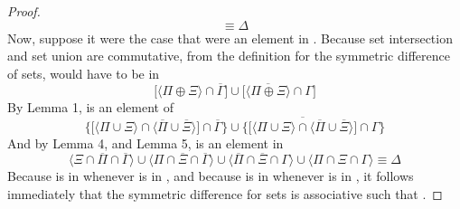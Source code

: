 \documentclass[preview]{standalone}
\begin{document}
\begin{proof}
\begin{equation*}
            \equiv
        \Delta
    \end{equation*}
    Now, suppose it were the case that \bm{$\zeta$} were an element in
    \bm{$
        \Gamma 
            \oplus 
    \big \langle \Pi \oplus \Xi \big \rangle
    $}. Because set intersection and set union are commutative,
    from the definition for the symmetric difference of sets,
    \bm{$\zeta$} would have to be in
    \begin{equation*}
        \bigg[
            \Big \langle \Pi \oplus \Xi \Big \rangle
                \cap
            \overline{\Gamma}
        \bigg]
            \cup
        \bigg[
            \Big \langle \overline{
                \Pi \oplus \Xi
            } \Big \rangle
                \cap
            \Gamma 
        \bigg]
    \end{equation*}
    By Lemma 1, \bm{$\zeta$} is an element of
    \begin{equation*}
        \Bigg\{
            \bigg[
                \Big \langle \Pi \cup \Xi \Big \rangle
                    \cap
                \Big \langle \overline{\Pi} \cup \overline{\Xi} \Big \rangle
            \bigg]
                \cap
            \overline{\Gamma}
        \Bigg\}
            \cup
        \Bigg\{
            \bigg[ \overline{
                \Big \langle \Pi \cup \Xi \Big \rangle
                \cap
            \Big \langle \overline{\Pi} \cup \overline{\Xi} \Big \rangle
            } \bigg]
                \cap
            \Gamma
        \Bigg\}
    \end{equation*}
    And by Lemma 4, and Lemma 5, \bm{$\zeta$} is an element in
    \begin{equation*}
        \Big \langle \Xi \cap \overline{\Pi} \cap \overline{\Gamma} \Big \rangle
            \cup
        \Big \langle \Pi \cap \overline{\Xi} \cap \overline{\Gamma} \Big \rangle
            \cup
        \Big \langle \overline{\Pi} \cap \overline{\Xi} \cap \Gamma \Big \rangle
            \cup
        \Big \langle \Pi \cap \Xi \cap \Gamma \Big \rangle
            \equiv
        \Delta
    \end{equation*}
    Because \bm{$\zeta$} is in \bm{$\Delta$} whenever \bm{$\zeta$} is in
    \bm{$\big \langle \Gamma \oplus \Pi \big \rangle \oplus \Xi$}, 
    and because \bm{$\zeta$} is in \bm{$\Delta$} whenever \bm{$\zeta$} is in
    \bm{$\Gamma \oplus \big \langle \Pi \oplus \Xi \big \rangle$}, 
    it follows immediately that the symmetric difference for sets is associative such that 
    \bm{$
        \big \langle \Gamma \oplus \Pi \big \rangle
            \oplus 
        \Xi 
            = 
        \Gamma 
            \oplus 
        \big \langle \Pi \oplus \Xi \big \rangle
    $}.
\end{proof}
\end{document}
